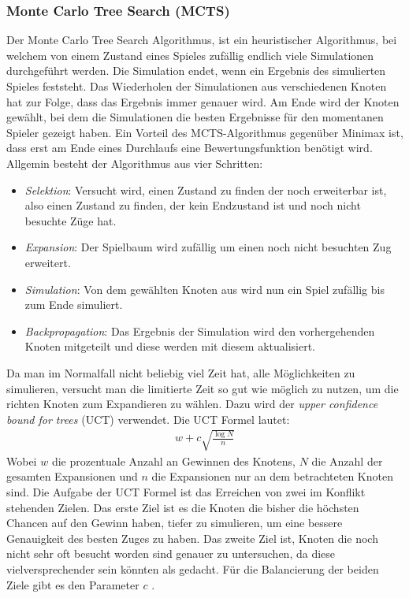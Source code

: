 \documentclass[12pt,a4paper,bibliography=totocnumbered,listof=totocnumbered]{article}
\begin{document}
\subsubsection{Monte Carlo Tree Search (MCTS)}
\label{chap:MCTS}
Der Monte Carlo Tree Search Algorithmus, ist ein heuristischer Algorithmus, bei welchem von einem
Zustand eines Spieles zufällig endlich viele Simulationen durchgeführt werden. Die Simulation endet, wenn
ein Ergebnis des simulierten Spieles feststeht. Das Wiederholen der Simulationen aus verschiedenen Knoten
hat zur Folge, dass das Ergebnis immer genauer wird. Am Ende wird der Knoten gewählt, bei dem die 
Simulationen die besten Ergebnisse für den momentanen Spieler gezeigt haben. Ein Vorteil des 
MCTS-Algorithmus gegenüber Minimax ist, dass erst am Ende eines Durchlaufs eine Bewertungsfunktion
benötigt wird. Allgemin besteht der Algorithmus aus vier Schritten:
\begin{itemize}
    \item \textit{Selektion}: Versucht wird, einen Zustand zu finden der noch erweiterbar ist, also
        einen Zustand zu finden, der kein Endzustand ist und noch nicht besuchte Züge hat.
    \item \textit{Expansion}: Der Spielbaum wird zufällig um einen noch nicht besuchten Zug erweitert.
    \item \textit{Simulation}: Von dem gewählten Knoten aus wird nun ein Spiel zufällig bis zum Ende 
        simuliert. 
    \item \textit{Backpropagation}: Das Ergebnis der Simulation wird den vorhergehenden Knoten mitgeteilt
        und diese werden mit diesem aktualisiert.
\end{itemize}
Da man im Normalfall nicht beliebig viel Zeit hat, alle Möglichkeiten zu simulieren, versucht man die limitierte Zeit
so gut wie möglich zu nutzen, um die richten Knoten zum Expandieren zu wählen. Dazu wird der \textit{upper confidence bound for trees} (UCT) verwendet.
Die UCT Formel lautet:
\begin{align}
	w + c \sqrt{\frac{\log{N}}{n}}
\end{align}
Wobei $w$ die prozentuale Anzahl an Gewinnen des Knotens, $N$ die Anzahl der gesamten Expansionen und $n$ die Expansionen nur an dem 
betrachteten Knoten sind. Die Aufgabe der UCT Formel ist das Erreichen von zwei im Konflikt stehenden Zielen. Das erste Ziel ist es die Knoten die bisher die 
höchsten Chancen auf den Gewinn haben, tiefer zu simulieren, um eine bessere Genauigkeit des besten Zuges zu haben.
Das zweite Ziel ist, Knoten die noch nicht sehr oft besucht worden sind genauer zu untersuchen, da diese vielversprechender sein könnten als gedacht.
Für die Balancierung der beiden Ziele gibt es den Parameter $c$ \cite{DeepLearingGo}.
\end{document}

